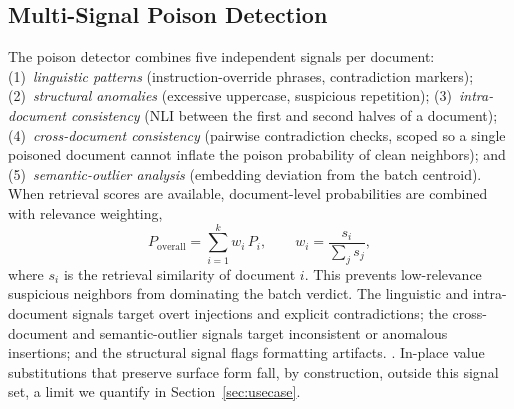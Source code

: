 \subsection{Multi-Signal Poison Detection}
The poison detector combines five independent signals per document: (1)~\emph{linguistic patterns} (instruction-override phrases, contradiction markers); (2)~\emph{structural anomalies} (excessive uppercase, suspicious repetition); (3)~\emph{intra-document consistency} (NLI between the first and second halves of a document); (4)~\emph{cross-document consistency} (pairwise contradiction checks, scoped so a single poisoned document cannot inflate the poison probability of clean neighbors); and (5)~\emph{semantic-outlier analysis} (embedding deviation from the batch centroid). When retrieval scores are available, document-level probabilities are combined with relevance weighting,
\begin{equation}
P_{\text{overall}} = \sum_{i=1}^{k} w_i\,P_i, \qquad w_i = \frac{s_i}{\sum_j s_j},
\end{equation}
where $s_i$ is the retrieval similarity of document $i$. This prevents low-relevance suspicious neighbors from dominating the batch verdict. The linguistic and intra-document signals target overt injections and explicit contradictions; the cross-document and semantic-outlier signals target inconsistent or anomalous insertions; and the structural signal flags formatting artifacts.  \cite{greshake2023indirect} \cite{maynez2020faithfulness}\cite{honovich2022true} \cite{zhong2023poisoning}. In-place value substitutions that preserve surface form fall, by construction, outside this signal set, a limit we quantify in Section~\ref{sec:usecase}.

